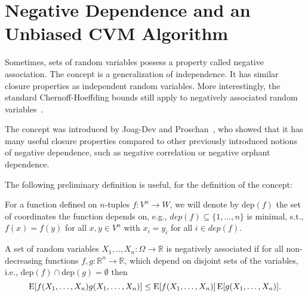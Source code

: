 \section{Negative Dependence and an Unbiased CVM Algorithm\label{sec:negdep}}

Sometimes, sets of random variables possess a property called negative association.
The concept is a generalization of independence.
It has similar closure properties as independent random variables.
More interestingly, the standard Chernoff-Hoeffding bounds still apply to negatively associated random variables~\cite[Prop. 7]{dubhashi1998}.

The concept was introduced by Joag-Dev and Proschan~\cite{joagdev1983}, who showed that it has many useful closure properties compared to other previously introduced notions of negative dependence, such as negative correlation or negative orphant dependence. 

The following preliminary definition is useful, for the definition of the concept:
\begin{definition}
For a function defined on $n$-tuples $f: V^n \rightarrow W$, we will denote by $\mathrm{dep}(f)$ the set of coordinates the function depends on, e.g., $dep(f) \subseteq \{1,\ldots,n\}$ is minimal, s.t., $f(x) = f(y)$ for all $x, y \in V^n$ with $x_i = y_i$ for all $i \in dep(f)$.
\end{definition}

\begin{definition}
A set of random variables $X_1,..,X_n: \Omega \rightarrow \mathbb R$ is negatively associated if for all non-decreasing functions $f,g: \mathbb R^n \rightarrow \mathbb R$, which depend on disjoint sets of the variables, i.e., $\mathrm{dep}(f) \cap \mathrm{dep}(g) = \emptyset$ then
\[
\operatorname{\mathrm{E}} [f(X_1,\ldots,X_n) g(X_1,\ldots,X_n)] \leq \operatorname{\mathrm{E}} [f(X_1,\ldots,X_n)] \operatorname{\mathrm{E}} [g(X_1,\ldots,X_n)] \textrm{.}
\]
\end{definition}


